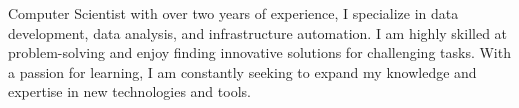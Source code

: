 

\begin{cvparagraph}


  Computer Scientist with over two years of experience, I specialize in data
  development, data analysis, and infrastructure automation. I am highly
  skilled at problem-solving and enjoy finding innovative solutions for
  challenging tasks. With a passion for learning, I am constantly seeking to
  expand my knowledge and expertise in new technologies and tools.


\end{cvparagraph}
